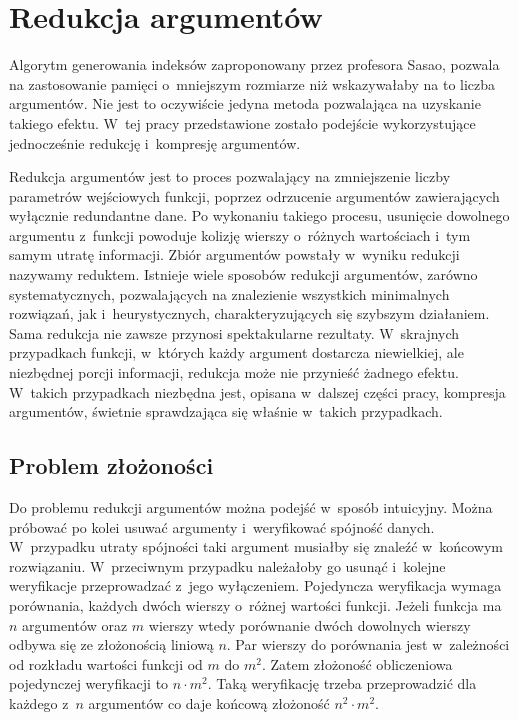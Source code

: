 \chapter{Redukcja argumentów}

Algorytm generowania indeksów zaproponowany przez profesora Sasao,
pozwala na zastosowanie pamięci o~mniejszym rozmiarze niż wskazywałaby na to liczba argumentów.
Nie jest to oczywiście jedyna metoda pozwalająca na  uzyskanie takiego efektu.
W~tej pracy przedstawione zostało podejście wykorzystujące jednocześnie redukcję i~kompresję argumentów.

Redukcja argumentów jest to proces pozwalający na zmniejszenie liczby parametrów wejściowych funkcji,
poprzez odrzucenie argumentów zawierających wyłącznie redundantne dane.
Po wykonaniu takiego procesu,
usunięcie dowolnego argumentu z~funkcji powoduje kolizję wierszy o~różnych wartościach i~tym samym utratę informacji.
Zbiór argumentów powstały w~wyniku redukcji nazywamy reduktem.
Istnieje wiele sposobów redukcji argumentów,
zarówno systematycznych,
pozwalających na znalezienie wszystkich minimalnych rozwiązań,
jak i~heurystycznych,
charakteryzujących się szybszym działaniem.
Sama redukcja nie zawsze przynosi spektakularne rezultaty.
W~skrajnych przypadkach funkcji,
w~których każdy argument dostarcza niewielkiej,
ale niezbędnej porcji informacji,
redukcja może nie przynieść żadnego efektu.
W~takich przypadkach niezbędna jest,
opisana w~dalszej części pracy,
kompresja argumentów,
świetnie sprawdzająca się właśnie w~takich przypadkach.

\section{Problem złożoności}

Do problemu redukcji argumentów można podejść w~sposób intuicyjny.
Można próbować po kolei usuwać argumenty i~weryfikować spójność danych.
W~przypadku utraty spójności taki argument musiałby się znaleźć w~końcowym rozwiązaniu.
W~przeciwnym przypadku należałoby go usunąć i~kolejne weryfikacje przeprowadzać z~jego wyłączeniem.
Pojedyncza weryfikacja wymaga porównania,
każdych dwóch wierszy o~różnej wartości funkcji.
Jeżeli funkcja ma $n$ argumentów oraz $m$ wierszy wtedy porównanie dwóch dowolnych wierszy odbywa się ze złożonością liniową $n$.
Par wierszy do porównania jest w~zależności od rozkładu wartości funkcji od $m$ do $m^2$.
Zatem złożoność obliczeniowa pojedynczej weryfikacji to $n \cdot m^2$.
Taką weryfikację trzeba przeprowadzić dla każdego z~$n$ argumentów co daje końcową złożoność $n^2 \cdot m^2$.

